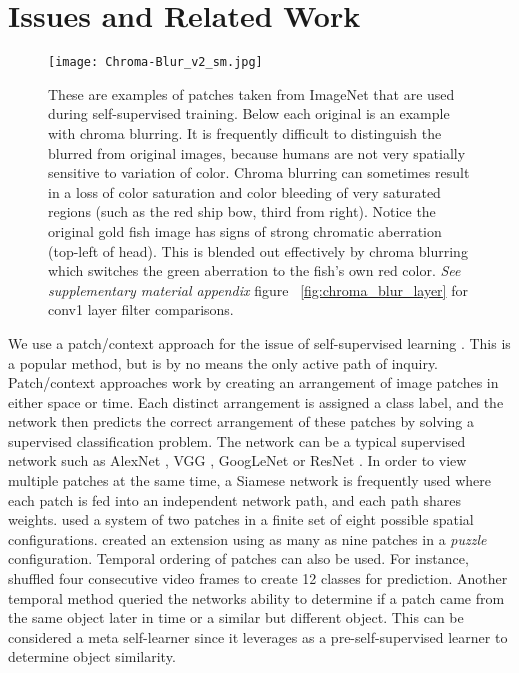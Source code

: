 \documentclass[10pt,twocolumn,letterpaper]{article}
\begin{document}
\section{Issues and Related Work}
\begin{figure*}
\centering
\texttt{[image: Chroma-Blur\_v2\_sm.jpg]}
\caption{These are examples of patches taken from ImageNet that are used during self-supervised training. Below each original is an example with chroma blurring. It is frequently difficult to distinguish the blurred from original images, because humans are not very spatially sensitive to variation of color. Chroma blurring can sometimes result in a loss of color saturation and color bleeding of very saturated regions (such as the red ship bow, third from right). Notice the original gold fish image has signs of strong chromatic aberration (top-left of head). This is blended out effectively by chroma blurring which switches the green aberration to the fish's own red color. \emph{See supplementary material appendix} figure ~\ref{fig:chroma_blur_layer} for conv1 layer filter comparisons. }
\label{fig:chroma_blur}
\end{figure*}
We use a patch/context approach for the issue of self-supervised learning \cite{Doersch15,Noroozi16a}. This is a popular method, but is by no means the only active path of inquiry. Patch/context approaches work by creating an arrangement of image patches in either space or time. Each distinct arrangement is assigned a class label, and the network then predicts the correct arrangement of these patches by solving a supervised classification problem. The network can be a typical supervised network such as AlexNet \cite{AlexNet}, VGG \cite{VGGNet}, GoogLeNet \cite{GoogLeNet} or ResNet \cite{ResNet}. In order to view multiple patches at the same time, a Siamese network is frequently used where each patch is fed into an independent network path, and each path shares weights. \cite{Doersch15} used a system of two patches in a finite set of eight possible spatial configurations. \cite{Noroozi16a} created an extension using as many as nine patches in a \emph{puzzle} configuration. Temporal ordering of patches can also be used. For instance, \cite{Lee17} shuffled four consecutive video frames to create 12 classes for prediction. Another temporal method \cite{Wang17} queried the networks ability to determine if a patch came from the same object later in time or a similar but different object. This can be considered a meta self-learner since it leverages \cite{Doersch15} as a pre-self-supervised learner to determine object similarity.
\end{document}
